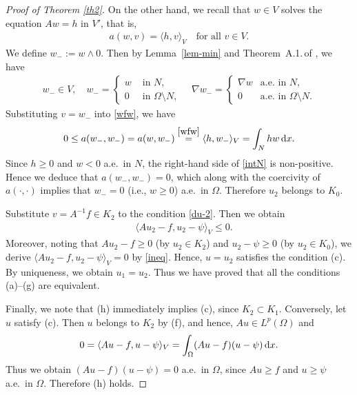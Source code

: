 \documentclass[reqno,10pt]{amsart}
\begin{document}
\begin{proof}[Proof of Theorem \ref{th2}]
On the other hand, we recall that $w\in V$ solves the equation $Aw=h$ in
 $V'$, that is, 
\begin{align}\label{wfw}
a(w,v)=\langle h,v\rangle_V
\quad
\mbox{for all }v\in V.
\end{align}
We define $w_-:= w \wedge 0$. Then by Lemma~\ref{lem-min} and
 Theorem~A.1.\,of \cite{K-S80}, we have
\begin{align*}
w_-\in V,
\quad
w_-= \begin{cases}
      w&\mbox{ in }N,\\
      0&\mbox{ in }\Omega\setminus N,
     \end{cases}
\quad
\nabla w_-= \begin{cases}
	     \nabla w&\mbox{a.e.~in }N,\\
	     0&\mbox{a.e.~in }\Omega\setminus N.
	    \end{cases}
\end{align*}
Substituting $v=w_-$ into \eqref{wfw}, we have
\begin{equation}\label{intN}
0 \leq a(w_-,w_-)=a(w,w_-)\stackrel{\eqref{wfw}}{=} \langle h,w_-\rangle_V
= \int_N hw\,{\text{\rm d}} x.
\end{equation}
Since $h\ge 0$ and $w<0$ a.e.~in $N$, the right-hand side of
 \eqref{intN} is non-positive. Hence we deduce that
$a(w_-,w_-)=0$, which along with the coercivity of $a(\cdot,\cdot)$ implies that
 $w_-=0$ (i.e., $w \geq 0$) a.e.~in $\Omega$. Therefore $u_2$ belongs to
 $K_0$.

Substitute $v=A^{-1}f\in K_2$ to the condition \eqref{du-2}. Then we obtain
\begin{align}\label{ineq}
\quad\langle Au_2-f,u_2-\psi\rangle_V \le 0.
\end{align}
Moreover, noting that $Au_2-f\ge 0$ (by $u_2 \in K_2$) and $u_2-\psi\ge
 0$ (by $u_2 \in K_0$), we derive
 $\langle Au_2-f,u_2-\psi\rangle_V =0$ by \eqref{ineq}.
Hence, $u=u_2$ satisfies the condition (c).
By uniqueness, we obtain $u_1=u_2$.
Thus we have proved that all the conditions (a)--(g) are
 equivalent. 

Finally, we note that (h) immediately implies (c), since $K_2 \subset
 K_1$. Conversely, let $u$ satisfy (c).
 Then $u$ belongs to $K_2$ by (f), and hence, $Au \in L^p(\Omega)$ and
 $$
 0 = \langle Au - f , u - \psi \rangle_V = \int_\Omega (Au - f)(u-\psi)
 \, {\text{\rm d}} x.
 $$ 
 Thus we obtain $(Au - f)(u - \psi) = 0$ a.e.~in $\Omega$, since $Au
 \geq f$ and $u \geq \psi$ a.e.~in $\Omega$. Therefore (h) holds.
\end{proof}
\end{document}
